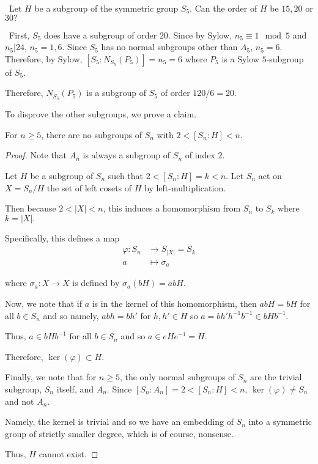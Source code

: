 \documentclass[12pt]{AlgebraQual}
\begin{document}
\begin{problem} $\,$
Let $H$ be a subgroup of the symmetric group $S_5$. Can the order of $H$ be $15,20$ or $30?$
\end{problem}


\begin{solution}$\,$
First, $S_5$ does have a subgroup of order $20$. Since by Sylow, $n_5\equiv 1\mod 5$ and $n_5|24$, $n_5=1,6$. Since $S_5$ has no normal subgroups other than $A_5$, $n_5=6$. Therefore, by Sylow, $[S_5:N_{S_5}(P_5)]=n_5=6$ where $P_5$ is a Sylow $5$-subgroup of $S_5$.

Therefore, $N_{S_5}(P_5)$ is a subgroup of $S_5$ of order $120/6=20.$

To disprove the other subgroups, we prove a claim.
\begin{claim} For $n\ge 5$, there are no subgroups of $S_n$ with $2<[S_n:H]<n$.
\begin{proof}
Note that $A_n$ is always a subgroup of $S_n$ of index $2.$

Let $H$ be a subgroup of $S_n$ such that $2<[S_n:H]=k<n$. Let $S_n$ act on $X=S_n/H$ the set of left cosets of $H$ by left-multiplication.

Then because $2<|X|<n$, this induces a homomorphism from $S_n$ to $S_k$ where $k=|X|.$

Specifically, this defines a map \begin{align*}
    \varphi:S_n&\to S_{|X|}=S_k\\
    a&\mapsto \sigma_a
\end{align*}

where $\sigma_a:X\to X$ is defined by $\sigma_a(bH)=abH$.

Now, we note that if $a$ is in the kernel of this homomorphism, then $abH=bH$ for all $b\in S_n$ and so namely, $abh=bh'$ for $h,h'\in H$ so $a=bh'h^{-1}b^{-1}\in bHb^{-1}.$

Thus, $a\in bHb^{-1}$ for all $b\in S_n$ and so $a\in eHe^{-1}=H$.

Therefore, $\ker(\varphi)\subset H$.

Finally, we note that for $n\ge 5$, the only normal subgroups of $S_n$ are the trivial subgroup, $S_n$ itself, and $A_n$. Since $[S_n:A_n]=2<[S_n:H]<n$, $\ker(\varphi)\not=S_n$ and not $A_n$.

Namely, the kernel is trivial and so we have an embedding of $S_n$ into a symmetric group of strictly smaller degree, which is of course, nonsense.

Thus, $H$ cannot exist.
\end{proof}
\end{claim}


\end{solution}
\end{document}
